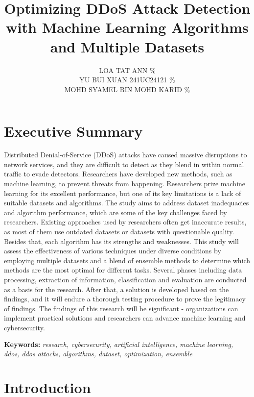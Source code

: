 \documentclass[a4paper, 12pt]{article}
\author{
LOA TAT ANN \quad 1221304731 \quad 33.33\% \\
YU BUI XUAN \quad 241UC24121 \quad 33.33\% \\
MOHD SYAMEL BIN MOHD KARID \quad 1221309130 \quad 33.33\% \\
}
\title{ Optimizing DDoS Attack Detection with Machine Learning Algorithms and Multiple Datasets }
\begin{document}
\maketitle


\section*{Executive Summary}

Distributed Denial-of-Service (DDoS) attacks have caused massive disruptions to network services, and they are difficult to detect as they blend in within normal traffic to evade detectors. Researchers have developed new methods, such as machine learning, to prevent threats from happening. Researchers prize machine learning for its excellent performance, but one of its key limitations is a lack of suitable datasets and algorithms. The study aims to address dataset inadequacies and algorithm performance, which are some of the key challenges faced by researchers. Existing approaches used by researchers often get inaccurate results, as most of them use outdated datasets or datasets with questionable quality. Besides that, each algorithm has its strengths and weaknesses. This study will assess the effectiveness of various techniques under diverse conditions by employing multiple datasets and a blend of ensemble methods to determine which methods are the most optimal for different tasks. Several phases including data processing, extraction of information, classification and evaluation are conducted as a basis for the research. After that, a solution is developed based on the findings, and it will endure a thorough testing procedure to prove the legitimacy of findings. The findings of this research will be significant - organizations can implement practical solutions and researchers can advance machine learning and cybersecurity.

\textbf{Keywords:} \textit{research, cybersecurity, artificial intelligence, machine learning, ddos, ddos attacks, algorithms, dataset, optimization, ensemble}

\section{Introduction}
\end{document}
